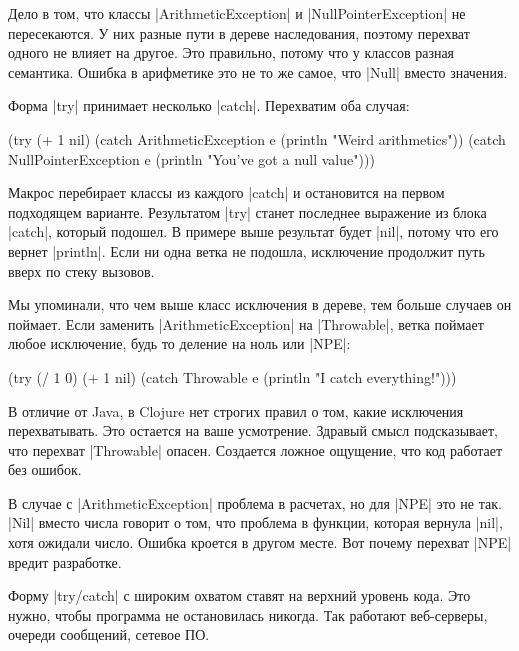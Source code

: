 Дело в том, что классы \spverb|ArithmeticException| и
\spverb|NullPointerException| не пересекаются. У них разные пути в дереве
наследования, поэтому перехват одного не влияет на другое. Это правильно, потому
что у классов разная семантика. Ошибка в арифметике это не то же самое, что
\spverb|Null| вместо значения.

Форма \spverb|try| принимает несколько \spverb|catch|. Перехватим оба случая:

\begin{english}
  \begin{clojure}
(try
  (+ 1 nil)
  (catch ArithmeticException e
    (println "Weird arithmetics"))
  (catch NullPointerException e
    (println "You've got a null value")))
  \end{clojure}
\end{english}


Макрос перебирает классы из каждого \spverb|catch| и остановится на первом
подходящем варианте. Результатом \spverb|try| станет последнее выражение из
блока \spverb|catch|, который подошел. В примере выше результат будет
\spverb|nil|, потому что его вернет \spverb|println|. Если ни одна ветка не
подошла, исключение продолжит путь вверх по стеку вызовов.

Мы упоминали, что чем выше класс исключения в дереве, тем больше случаев он
поймает. Если заменить \spverb|ArithmeticException| на \spverb|Throwable|, ветка
поймает любое исключение, будь то деление на ноль или \spverb|NPE|:

\begin{english}
  \begin{clojure}
(try
  (/ 1 0)
  (+ 1 nil)
  (catch Throwable e
    (println "I catch everything!")))
  \end{clojure}
\end{english}

В отличие от Java, в Clojure нет строгих правил о том, какие исключения
перехватывать. Это остается на ваше усмотрение. Здравый смысл подсказывает, что
перехват \spverb|Throwable| опасен. Создается ложное ощущение, что код работает
без ошибок.

В случае с \spverb|ArithmeticException| проблема в расчетах, но для \spverb|NPE|
это не так. \spverb|Nil| вместо числа говорит о том, что проблема в функции,
которая вернула \spverb|nil|, хотя ожидали число. Ошибка кроется в другом
месте. Вот почему перехват \spverb|NPE| вредит разработке.

Форму \spverb|try/catch| с широким охватом ставят на верхний уровень кода. Это
нужно, чтобы программа не остановилась никогда. Так работают веб-серверы,
очереди сообщений, сетевое ПО.

